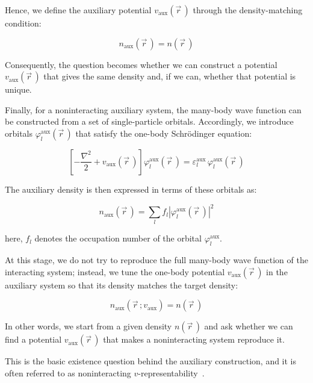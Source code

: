Hence, we define the auxiliary potential $v_\mathrm{aux}(\vec{r}\,)$ through the density-matching condition:

\begin{equation}
n_\mathrm{aux}(\vec{r}\,) = n(\vec{r}\,)
\label{auxiliary_density_matching_condition}
\end{equation}

Consequently, the question becomes whether we can construct a potential $v_\mathrm{aux}(\vec{r}\,)$ that gives the same density and, if we can, whether that potential is unique.

Finally, for a noninteracting auxiliary system, the many-body wave function can be constructed from a set of single-particle orbitals.
Accordingly, we introduce orbitals $\varphi^\mathrm{aux}_l(\vec{r}\,)$ that satisfy the one-body Schrödinger equation:

\begin{equation}
    \left[-\frac{\nabla^2}{2}+v_\mathrm{aux}(\vec{r}\,)\right]
    \varphi^\mathrm{aux}_l(\vec{r}\,)
    = \varepsilon^\mathrm{aux}_l\,\varphi^\mathrm{aux}_l(\vec{r}\,)
\label{aux_single_particle_equation}
\end{equation}

The auxiliary density is then expressed in terms of these orbitals as:

\begin{equation}
    n_\mathrm{aux}(\vec{r}\,) = \sum_l f_l\left|\varphi^\mathrm{aux}_l(\vec{r}\,)\right|^2
\label{aux_density_orbitals}
\end{equation}

here, $f_l$ denotes the occupation number of the orbital $\varphi^\mathrm{aux}_l$.

At this stage, we do not try to reproduce the full many-body wave function of the interacting system;
instead, we tune the one-body potential $v_\mathrm{aux}(\vec{r}\,)$ in the auxiliary system so that its density matches the target density:

\begin{equation}
    n_\mathrm{aux}(\vec{r}\,;v_\mathrm{aux}) = n(\vec{r}\,)
\label{auxiliary_density_matching_condition_with_potential}
\end{equation}
 
In other words, we start from a given density $n(\vec{r}\,)$ and ask whether we can find a potential $v_\mathrm{aux}(\vec{r}\,)$ that makes a noninteracting system reproduce it.

This is the basic existence question behind the auxiliary construction,
and it is often referred to as noninteracting $v$-representability~\cite{de2012pure}.

